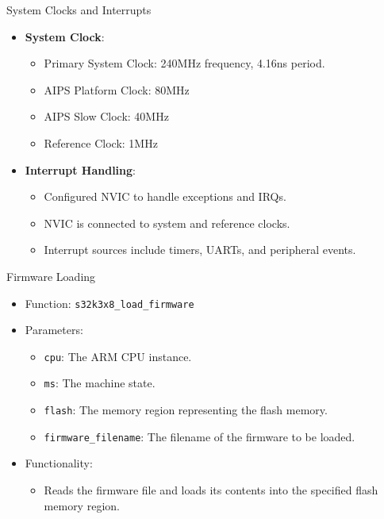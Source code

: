 \begin{frame}{System Clocks and Interrupts}
    \begin{itemize}
        \item \textbf{System Clock}:
        \begin{itemize}
            \item Primary System Clock: 240MHz frequency, 4.16ns period.
            \item AIPS Platform Clock: 80MHz
            \item AIPS Slow Clock: 40MHz
            \item Reference Clock: 1MHz
        \end{itemize}
        \item \textbf{Interrupt Handling}:
        \begin{itemize}
            \item Configured NVIC to handle exceptions and IRQs.
            \item NVIC is connected to system and reference clocks.
            \item Interrupt sources include timers, UARTs, and peripheral events.
        \end{itemize}
    \end{itemize}
\end{frame}

\begin{frame}{Firmware Loading}
    \begin{itemize}
        \item Function: \texttt{s32k3x8\_load\_firmware}
        \item Parameters:
        \begin{itemize}
            \item \texttt{cpu}: The ARM CPU instance.
            \item \texttt{ms}: The machine state.
            \item \texttt{flash}: The memory region representing the flash memory.
            \item \texttt{firmware\_filename}: The filename of the firmware to be loaded.
        \end{itemize}
        \item Functionality:
        \begin{itemize}
            \item Reads the firmware file and loads its contents into the specified flash memory region.
        \end{itemize}
    \end{itemize}
\end{frame}

